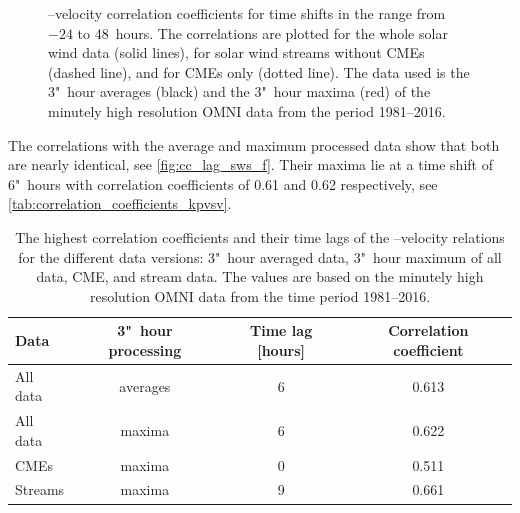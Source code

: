 \begin{figure}[htb]
\begin{floatrow}
{		}{
			\caption[I created the figure myself.]
			{\Kp{}--velocity correlation coefficients for time shifts in the range from $-24$ to 48~hours. The correlations are plotted for the whole solar wind data (solid lines), for solar wind streams without CMEs (dashed line), and for CMEs only (dotted line). The data used is the 3"~hour averages (black) and the 3"~hour maxima (red) of the minutely high resolution OMNI data from the period 1981--2016.}
			\label{fig:cc_lag_sws_f}
		}
	\end{floatrow}
\end{figure}

The \Kp{} correlations with the average and maximum processed data show that both are nearly identical, see \autoref{fig:cc_lag_sws_f}. Their maxima lie at a time shift of 6"~hours with correlation coefficients of 0.61 and 0.62 respectively, see \autoref{tab:correlation_coefficients_kpvsv}.
\begin{table}
	\caption{The highest correlation coefficients and their time lags of the \Kp{}--velocity relations for the different data versions: 3"~hour averaged data, 3"~hour maximum of all data, CME, and stream data. The values are based on the minutely high resolution OMNI data from the time period 1981--2016.}
	\label{tab:correlation_coefficients_kpvsv}
	\centering
	\begin{tabular}{lccc}
		\hline\hline
		Data	&3"~hour processing	&Time lag [hours]	&Correlation coefficient\\
		\hline
		All data	&averages	&6	&0.613\\
		All data	&maxima	&6	&0.622\\
		CMEs	&maxima	&0	&0.511\\
		Streams	&maxima	&9	&0.661\\
		\hline
	\end{tabular}
\end{table}
% 

